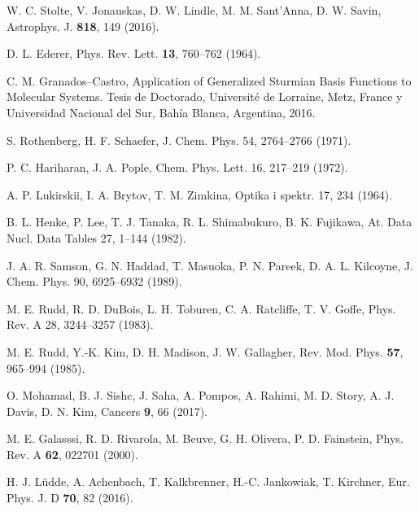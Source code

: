 \begin{thebibliography}{9}
W. C. Stolte, V. Jonauskas, D. W. Lindle, M. M. Sant'Anna, D. W. Savin, 
Astrophys. J. \textbf{818}, 149 (2016).

D. L. Ederer, 
Phys. Rev. Lett. \textbf{13}, 760--762 (1964).


C. M. Granados--Castro, 
Application of Generalized Sturmian Basis Functions to Molecular Systems.
Tesis de Doctorado, Universit\'e de Lorraine, Metz, France y 
Universidad Nacional del Sur, Bah\'ia Blanca, Argentina, 2016.

S. Rothenberg, H. F. Schaefer, 
J. Chem. Phys. 54, 2764--2766 (1971).

P. C. Hariharan, J. A. Pople, 
Chem. Phys. Lett. 16, 217--219 (1972).

A. P. Lukirskii, I. A. Brytov, T. M. Zimkina, 
Optika i spektr. 17, 234 (1964).

B. L. Henke, P. Lee, T. J. Tanaka, R. L. Shimabukuro, B. K. Fujikawa, 
At. Data Nucl. Data Tables 27, 1--144 (1982).

J. A. R. Samson, G. N. Haddad, T. Masuoka, P. N. Pareek, D. A. L. Kilcoyne, 
J. Chem. Phys. 90, 6925--6932 (1989).

M. E. Rudd, R. D. DuBois, L. H. Toburen, C. A. Ratcliffe, T. V. Goffe, 
Phys. Rev. A 28, 3244--3257 (1983).

M. E. Rudd, Y.-K. Kim, D. H. Madison, J. W. Gallagher, 
Rev. Mod. Phys. \textbf{57}, 965--994 (1985).


O. Mohamad, B. J. Sishc, J. Saha, A. Pompos, A. Rahimi, M. D. Story, 
A. J. Davis, D. N. Kim, 
Cancers \textbf{9}, 66 (2017).

M. E. Galasssi, R. D. Rivarola, M. Beuve, G. H. Olivera, P. D. Fainstein, 
Phys. Rev. A \textbf{62}, 022701 (2000).

H. J. L\"udde, A. Achenbach, T. Kalkbrenner, H.-C. Jankowiak, T. Kirchner,
Eur. Phys. J. D \textbf{70}, 82 (2016).


\end{thebibliography}

